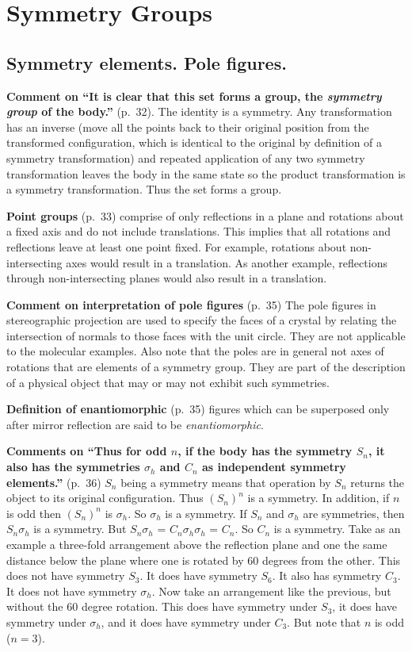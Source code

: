 \chapter{Symmetry Groups}

\section{Symmetry elements. Pole figures.}

{\bf Comment on ``It is clear that this set forms a group, the {\it
    symmetry group} of the body.''} (p.\ 32). The identity is a
symmetry. Any transformation has an inverse (move all the points back
to their original position from the transformed configuration, which
is identical to the original by definition of a symmetry
transformation) and repeated application of any two symmetry
transformation leaves the body in the same state so the product
transformation is a symmetry transformation. Thus the set forms a
group.

{\bf Point groups} (p.\ 33) comprise of only reflections in a plane and
rotations about a fixed axis and do not include translations. This
implies that all rotations and reflections leave at least one point
fixed. For example, rotations about non-intersecting axes would result
in a translation. As another example, reflections through
non-intersecting planes would also result in a translation.

{\bf Comment on interpretation of pole figures} (p.\ 35) The pole
figures in stereographic projection are used to specify the faces of a
crystal by relating the intersection of normals to those faces with
the unit circle. They are not applicable to the molecular
examples. Also note that the poles are in general not axes of
rotations that are elements of a symmetry group. They are part of the
description of a physical object that may or may not exhibit such
symmetries.

{\bf Definition of enantiomorphic} (p.\ 35) figures which can be
superposed only after mirror reflection are said to be {\it
  enantiomorphic}.

{\bf Comments on ``Thus for odd $n$, if the body has the symmetry
  $S_n$, it also has the symmetries $\sigma_h$ and $C_n$ as
  independent symmetry elements.''} (p.\ 36) $S_n$ being a symmetry
means that operation by $S_n$ returns the object to its original
configuration. Thus $(S_n)^n$ is a symmetry. In addition, if $n$ is
odd then $(S_n)^n$ is $\sigma_h$. So $\sigma_h$ is a symmetry. If
$S_n$ and $\sigma_h$ are symmetries, then $S_n\sigma_h$ is a symmetry.
But $S_n\sigma_h$ = $C_n\sigma_h\sigma_h$ = $C_n$. So $C_n$ is a
symmetry. Take as an example a three-fold
arrangement above the reflection plane and one the same distance below
the plane where one is rotated by 60 degrees from the other.  This
does not have symmetry $S_3$. It does have symmetry $S_6$. It also has
symmetry $C_3$. It does not have symmetry $\sigma_h$.  Now take an
arrangement like the previous, but without the 60 degree
rotation. This does have symmetry under $S_3$, it does have symmetry
under $\sigma_h$, and it does have symmetry under $C_3$. But note that
$n$ is odd ($n = 3$).

